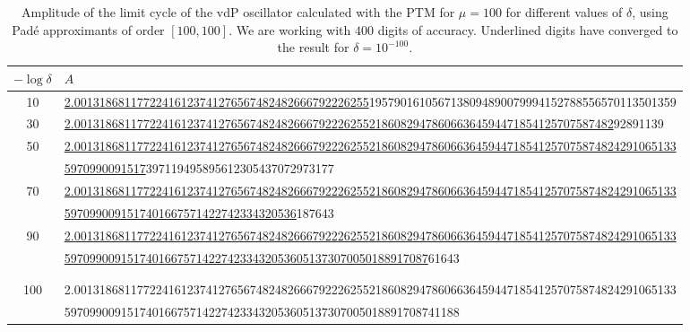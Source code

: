 \documentclass[final]{article}
\begin{document}
\begin{table}
	\caption{Amplitude of the limit cycle of the vdP oscillator calculated with the PTM for $\mu=100$ for different values of $\delta$, using Pad\'e approximants of order $[100,100]$. We are working with $400$ digits of accuracy. Underlined digits have converged to the result for $\delta=10^{-100}$.}
	\bigskip
	\label{table_A_100_vdP}
	\begin{tabular}{|c|l|}
		\hline
		$-\log \delta$ &   $A$    \\
		\hline
		10	&  \underline{2.00131868117722416123741276567482482666792226255}1957901610567138094890079994152788556570113501359 \\
		30	&  \underline{2.00131868117722416123741276567482482666792226255218608294786066364594471854125707587482}92891139 \\
		50	&  \underline{2.001318681177224161237412765674824826667922262552186082947860663645944718541257075874824291065133} \\
		&  \hspace{0.5cm}  \underline{5970990091517}397119495895612305437072973177 \\
		70	&  \underline{2.001318681177224161237412765674824826667922262552186082947860663645944718541257075874824291065133} \\    
		&  \hspace{0.5cm} \underline{5970990091517401667571422742334320536}187643 \\
		90	&  \underline{2.001318681177224161237412765674824826667922262552186082947860663645944718541257075874824291065133} \\
		&  \hspace{0.5cm} \underline{5970990091517401667571422742334320536051373070050188917087}61643 \\
		& \\
		\hline \hline
		& \\
		100	& 2.001318681177224161237412765674824826667922262552186082947860663645944718541257075874824291065133\\
		&  \hspace{0.5cm} 597099009151740166757142274233432053605137307005018891708741188 \\
		\hline
		\hline
	\end{tabular}
	\bigskip\bigskip
\end{table}
\end{document}
